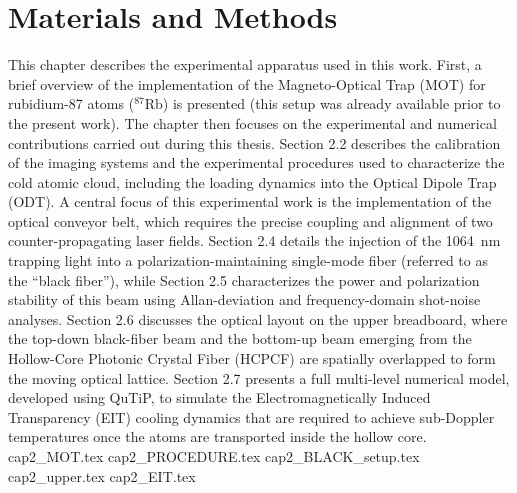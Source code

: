 \documentclass[../../thesis_main.tex]{subfiles}
\begin{document}
    \ifSubfilesClassLoaded{\tableofcontents}{}

    \chapter{Materials and Methods}\label{cap2}
    This chapter describes the experimental apparatus used in this work. First, a brief overview of the implementation of the Magneto-Optical Trap (MOT) for rubidium-87 atoms ($^{87}\mathrm{Rb}$) is presented (this setup was already available prior to the present work). The chapter then focuses on the experimental and numerical contributions carried out during this thesis. Section 2.2 describes the calibration of the imaging systems and the experimental procedures used to characterize the cold atomic cloud, including the loading dynamics into the Optical Dipole Trap (ODT). A central focus of this experimental work is the implementation of the optical conveyor belt, which requires the precise coupling and alignment of two counter-propagating laser fields. Section 2.4 details the injection of the 1064~nm trapping light into a polarization-maintaining single-mode fiber (referred to as the ``black fiber''), while Section 2.5 characterizes the power and polarization stability of this beam using Allan-deviation and frequency-domain shot-noise analyses. Section 2.6 discusses the optical layout on the upper breadboard, where the top-down black-fiber beam and the bottom-up beam emerging from the Hollow-Core Photonic Crystal Fiber (HCPCF) are spatially overlapped to form the moving optical lattice. Section 2.7 presents a full multi-level numerical model, developed using QuTiP, to simulate the Electromagnetically Induced Transparency (EIT) cooling dynamics that are required to achieve sub-Doppler temperatures once the atoms are transported inside the hollow core.
    {cap2_MOT.tex}
    \clearpage
    {cap2_PROCEDURE.tex}
    \clearpage
    {cap2_BLACK_setup.tex}
    \clearpage
    {cap2_upper.tex}
    \clearpage
    {cap2_EIT.tex} 

    \ifSubfilesClassLoaded{\printbibliography}{}
\end{document}
